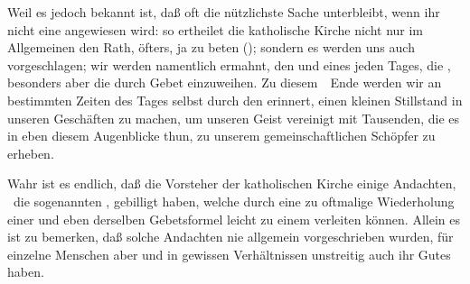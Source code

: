 \begin{aufza}
\item Weil es jedoch bekannt ist, daß oft die nützlichste Sache unterbleibt, wenn ihr nicht eine  angewiesen wird: so ertheilet die katholische Kirche nicht nur im Allgemeinen den Rath, öfters, ja  zu beten (); sondern es werden uns auch  vorgeschlagen; wir werden namentlich ermahnt, den  und  eines jeden Tages, die , besonders aber die  durch Gebet einzuweihen. Zu diesem~\ Ende werden wir an bestimmten Zeiten des Tages selbst durch den  erinnert, einen kleinen Stillstand in unseren Geschäften zu machen, um unseren Geist vereinigt mit Tausenden, die es in eben diesem Augenblicke thun, zu unserem gemeinschaftlichen Schöpfer zu erheben.
\item Wahr ist es endlich, daß die Vorsteher der katholischen Kirche einige Andachten, \zB\  die sogenannten , gebilligt haben, welche durch eine zu oftmalige Wiederholung einer und eben derselben Gebetsformel leicht zu einem  verleiten können. Allein es ist zu bemerken, daß solche Andachten nie allgemein vorgeschrieben wurden, für einzelne Menschen aber und in gewissen Verhältnissen unstreitig auch ihr Gutes haben.
\end{aufza}

